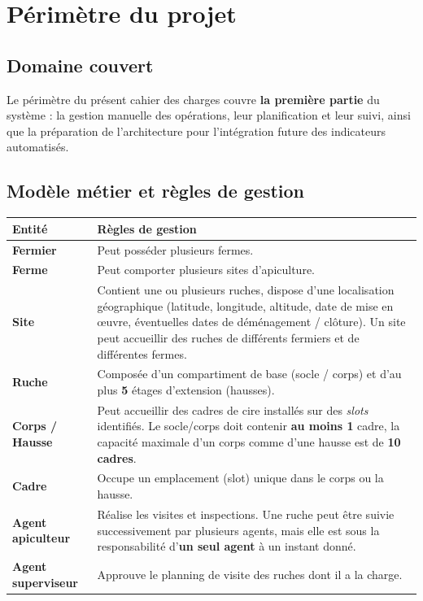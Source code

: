 \chapter{Périmètre du projet}

\section{Domaine couvert}
Le périmètre du présent cahier des charges couvre \textbf{la première partie}
du système : la gestion manuelle des opérations, leur planification et leur
suivi, ainsi que la préparation de l'architecture pour l'intégration future
des indicateurs automatisés.

\section{Modèle métier et règles de gestion}
\begin{longtable}{>{\bfseries}p{3cm} p{11cm}}
\toprule
\textbf{Entité} & \textbf{Règles de gestion} \\
\midrule
\endhead
Fermier   & Peut posséder plusieurs fermes. \\
Ferme     & Peut comporter plusieurs sites d'apiculture. \\
Site      & Contient une ou plusieurs ruches, dispose d'une localisation géographique (latitude, longitude, altitude, date de mise en œuvre, éventuelles dates de déménagement / clôture). Un site peut accueillir des ruches de différents fermiers et de différentes fermes. \\
Ruche     & Composée d'un compartiment de base (socle / corps) et d'au plus \textbf{5} étages d'extension (hausses). \\
Corps / Hausse & Peut accueillir des cadres de cire installés sur des \emph{slots} identifiés. Le socle/corps doit contenir \textbf{au moins 1} cadre, la capacité maximale d'un corps comme d'une hausse est de \textbf{10 cadres}. \\
Cadre     & Occupe un emplacement (slot) unique dans le corps ou la hausse. \\
Agent apiculteur & Réalise les visites et inspections. Une ruche peut être suivie successivement par plusieurs agents, mais elle est sous la responsabilité d'\textbf{un seul agent} à un instant donné. \\
Agent superviseur & Approuve le planning de visite des ruches dont il a la charge. \\
\bottomrule
\end{longtable}

